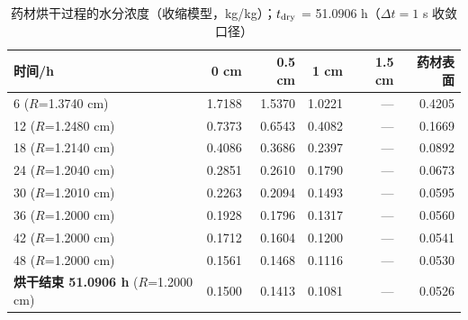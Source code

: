 \begin{table}[H]
  \centering
  \caption{药材烘干过程的水分浓度（收缩模型，kg/kg）；$t_{\mathrm{dry}}$ = 51.0906 h（$\Delta t=1$ s 收敛口径）}
  \label{tab:p4C}
  \footnotesize
  \begin{tabular}{@{}lrrrrr@{}}
    \toprule
    时间/h & 0 cm & 0.5 cm & 1 cm & 1.5 cm & 药材表面 \\
    \midrule
    6 \quad ($R$=1.3740 cm) & 1.7188 & 1.5370 & 1.0221 & --- & 0.4205 \\
    12 \quad ($R$=1.2480 cm) & 0.7373 & 0.6543 & 0.4082 & --- & 0.1669 \\
    18 \quad ($R$=1.2140 cm) & 0.4086 & 0.3686 & 0.2397 & --- & 0.0892 \\
    24 \quad ($R$=1.2040 cm) & 0.2851 & 0.2610 & 0.1790 & --- & 0.0673 \\
    30 \quad ($R$=1.2010 cm) & 0.2263 & 0.2094 & 0.1493 & --- & 0.0595 \\
    36 \quad ($R$=1.2000 cm) & 0.1928 & 0.1796 & 0.1317 & --- & 0.0560 \\
    42 \quad ($R$=1.2000 cm) & 0.1712 & 0.1604 & 0.1200 & --- & 0.0541 \\
    48 \quad ($R$=1.2000 cm) & 0.1561 & 0.1468 & 0.1116 & --- & 0.0530 \\
    \textbf{烘干结束 51.0906 h} \quad ($R$=1.2000 cm) & 0.1500 & 0.1413 & 0.1081 & --- & 0.0526 \\
    \bottomrule
  \end{tabular}
\end{table}
